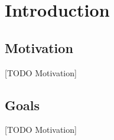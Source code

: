 \chapter{Introduction}
\label{cha:Introduction}

\section{Motivation}

[TODO Motivation]

\section{Goals}

[TODO Motivation]


